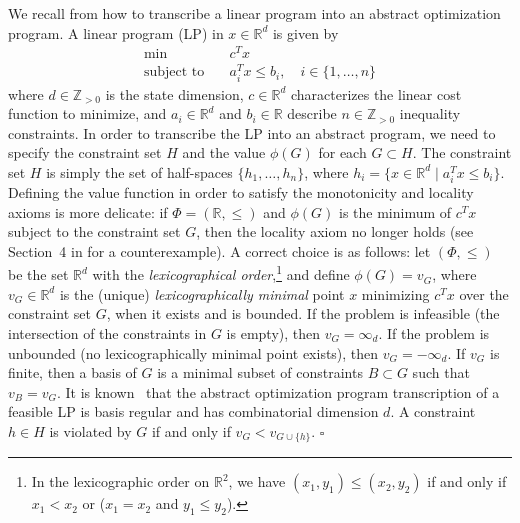 \documentclass[onecolumn,journal,letterpaper]{IEEEtran}
\renewcommand{\natural}{{\mathbb{N}}}
\renewcommand{\natural}{{\mathbb{Z}_{>0}}}
\newcommand{\real}{{\mathbb{R}}}
\newcommand{\union}{\cup}
\newcommand{\setdef}[2]{\{#1 \; | \; #2\}}
\newcommand{\until}[1]{\{1,\dots,#1\}}
\newcommand{\subject}{\text{subject to}}
\newcommand\oprocendsymbol{\hbox{$\square$}}
\newcommand\oprocend{\relax\ifmmode\else\unskip\hfill\fi\oprocendsymbol}
\begin{document}
\begin{example}
  \label{ex:abstract-framework-for-LP}
  We recall from \cite{BG-EW:96} how to transcribe a linear program into an
  abstract optimization program.  A linear program (LP) in ${x\in\real^d}$
  is given by
  \begin{equation*}
    \begin{split}
      \min &\quad c^T x\\
      \subject &\quad a_i^T x \leq b_i, \quad i\in\until{n}
    \end{split}
  \end{equation*}
  where $d\in \natural$ is the state dimension, $c\in\real^d$ characterizes
  the linear cost function to minimize, and $a_i \in \real^{d}$ and $b_i\in
  \real$ describe $n\in\natural$ inequality constraints.  In order to
  transcribe the LP into an abstract program, we need to specify the
  constraint set $H$ and the value $\phi(G)$ for each $G\subset H$. The
  constraint set $H$ is simply the set of half-spaces $\{h_1, \ldots,
  h_n\}$, where $h_i = \setdef{x\in\real^d}{a_i^T x \leq b_i}$.  Defining
  the value function in order to satisfy the monotonicity and locality
  axioms is more delicate: if $\Phi=(\real,\leq)$ and $\phi(G)$ is the
  minimum of $c^T x$ subject to the constraint set $G$, then the locality
  axiom no longer holds (see Section~4 in \cite{BG-EW:96} for a
  counterexample).  A correct choice is as follows: let $(\Phi, \leq)$ be
  the set $\real^d$ with the \emph{lexicographical order},\footnote{In the
    lexicographic order on $\real^2$, we have $(x_1,y_1)\leq(x_2,y_2)$ if
    and only if $x_1<x_2$ or ($x_1=x_2$ and $y_1\leq y_2$).} and define
  $\phi(G) = v_G$, where $v_G \in \real^d$ is the (unique)
  \emph{lexicographically minimal} point $x$ minimizing $c^T x$ over the
  constraint set $G$, when it exists and is bounded. If the problem is
  infeasible (the intersection of the constraints in $G$ is empty), then
  $v_G = \infty_d$.  If the problem is unbounded (no lexicographically
  minimal point exists), then $v_G = -\infty_d$.  If $v_G$ is finite, then
  a basis of $G$ is a minimal subset of constraints $B\subset G$ such that
  $v_B = v_G$.  It is known~\cite{JM-MS-EW:96} that the abstract
  optimization program transcription of a feasible LP is basis regular and
  has combinatorial dimension $d$. A constraint $h\in H$ is violated by $G$
  if and only if $v_G < v_{G\union \{h\}}$.  \oprocend
\end{example}
\end{document}
